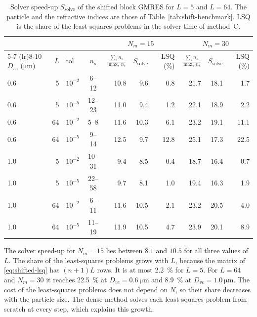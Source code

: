 \documentclass[11pt,a4paper]{article}
\begin{document}
\begin{table}[htbp]
  \centering
  \caption{Solver speed-up $S_{\text{solve}}$ of the shifted block GMRES
           for $L = 5$ and $L = 64$.
           The particle and the refractive indices are those of
           Table~\ref{tab:shift-benchmark}.
           LSQ is the share of the least-squares problems in the solver
           time of method~C.}
  \label{tab:shift-benchmark-L}
  \begin{tabular}{lrlcrrrrrr}
    \toprule
    & & & & \multicolumn{3}{c}{$N_m = 15$}
          & \multicolumn{3}{c}{$N_m = 30$} \\
    \cmidrule(lr){5-7} \cmidrule(lr){8-10}
    $D_{ve}$ (\si{\micro\meter}) & $L$ & tol & $n_s$
      & $\frac{\sum_s n_s}{\max_s n_s}$ & $S_{\text{solve}}$
      & LSQ (\si{\percent})
      & $\frac{\sum_s n_s}{\max_s n_s}$ & $S_{\text{solve}}$
      & LSQ (\si{\percent}) \\
    \midrule
    0.6 &  5 & $10^{-2}$ & 6--12  & 10.8 &  9.6 &  0.8 & 21.7 & 18.1 &  1.7 \\
    0.6 &  5 & $10^{-5}$ & 12--23 & 11.0 &  9.4 &  1.2 & 22.1 & 18.9 &  2.2 \\
    0.6 & 64 & $10^{-2}$ & 5--8   & 11.6 & 10.3 &  6.1 & 23.2 & 19.1 & 11.1 \\
    0.6 & 64 & $10^{-5}$ & 9--14  & 12.5 &  9.7 & 12.8 & 25.1 & 17.3 & 22.5 \\
    1.0 &  5 & $10^{-2}$ & 10--31 &  9.4 &  8.5 &  0.4 & 18.7 & 16.4 &  0.7 \\
    1.0 &  5 & $10^{-5}$ & 22--58 &  9.7 &  8.1 &  1.0 & 19.4 & 16.3 &  1.9 \\
    1.0 & 64 & $10^{-2}$ & 6--11  & 11.6 & 10.5 &  2.1 & 23.2 & 20.5 &  4.0 \\
    1.0 & 64 & $10^{-5}$ & 11--19 & 11.9 & 10.5 &  4.7 & 23.9 & 20.1 &  8.9 \\
    \bottomrule
  \end{tabular}
\end{table}

The solver speed-up for $N_m = 15$ lies between $8.1$ and $10.5$ for
all three values of $L$.
The share of the least-squares problems grows with $L$, because the
matrix of \eqref{eq:shifted-lsq} has $(n+1)L$ rows.
It is at most \SI{2.2}{\percent} for $L = 5$.
For $L = 64$ and $N_m = 30$ it reaches \SI{22.5}{\percent} at
$D_{ve} = \SI{0.6}{\micro\meter}$ and \SI{8.9}{\percent} at
$D_{ve} = \SI{1.0}{\micro\meter}$.
The cost of the least-squares problems does not depend on $N$, so their
share decreases with the particle size.
The dense method solves each least-squares problem from scratch at
every step, which explains this growth.
\end{document}
